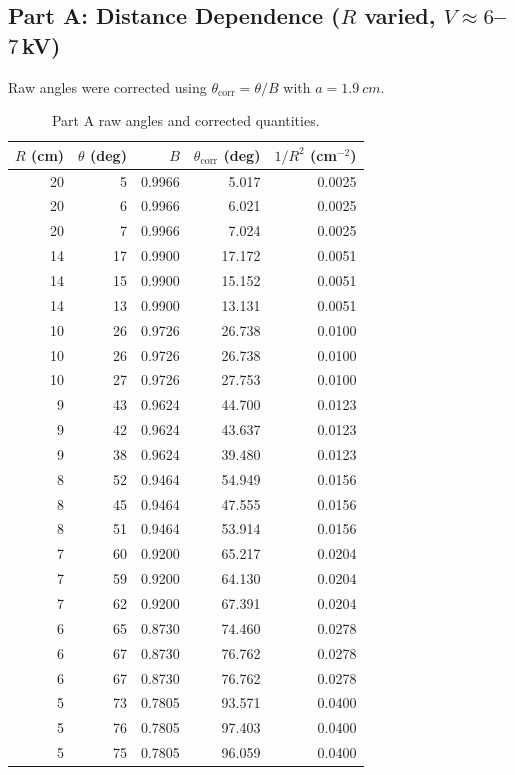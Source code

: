 \documentclass[12pt]{article}
\begin{document}
\subsection*{Part A: Distance Dependence ($R$ varied, $V\approx 6$--$7$\,kV)}
Raw angles were corrected using $\theta_{\mathrm{corr}}=\theta/B$ with $a=\SI{1.9}{cm}$.
\begin{table}[H]
\centering
\caption{Part A raw angles and corrected quantities.}
\begin{tabular}{@{}rrrrr@{}}
\toprule
$R$ (cm) & $\theta$ (deg) & $B$ & $\theta_{\mathrm{corr}}$ (deg) & $1/R^2$ (cm$^{-2}$) \\
\midrule
20 & 5  & 0.9966 & 5.017 & 0.0025 \\
20 & 6  & 0.9966 & 6.021 & 0.0025 \\
20 & 7  & 0.9966 & 7.024 & 0.0025 \\
14 & 17 & 0.9900 & 17.172 & 0.0051 \\
14 & 15 & 0.9900 & 15.152 & 0.0051 \\
14 & 13 & 0.9900 & 13.131 & 0.0051 \\
10 & 26 & 0.9726 & 26.738 & 0.0100 \\
10 & 26 & 0.9726 & 26.738 & 0.0100 \\
10 & 27 & 0.9726 & 27.753 & 0.0100 \\
9  & 43 & 0.9624 & 44.700 & 0.0123 \\
9  & 42 & 0.9624 & 43.637 & 0.0123 \\
9  & 38 & 0.9624 & 39.480 & 0.0123 \\
8  & 52 & 0.9464 & 54.949 & 0.0156 \\
8  & 45 & 0.9464 & 47.555 & 0.0156 \\
8  & 51 & 0.9464 & 53.914 & 0.0156 \\
7  & 60 & 0.9200 & 65.217 & 0.0204 \\
7  & 59 & 0.9200 & 64.130 & 0.0204 \\
7  & 62 & 0.9200 & 67.391 & 0.0204 \\
6  & 65 & 0.8730 & 74.460 & 0.0278 \\
6  & 67 & 0.8730 & 76.762 & 0.0278 \\
6  & 67 & 0.8730 & 76.762 & 0.0278 \\
5  & 73 & 0.7805 & 93.571 & 0.0400 \\
5  & 76 & 0.7805 & 97.403 & 0.0400 \\
5  & 75 & 0.7805 & 96.059 & 0.0400 \\
\bottomrule
\end{tabular}
\end{table}
\end{document}
